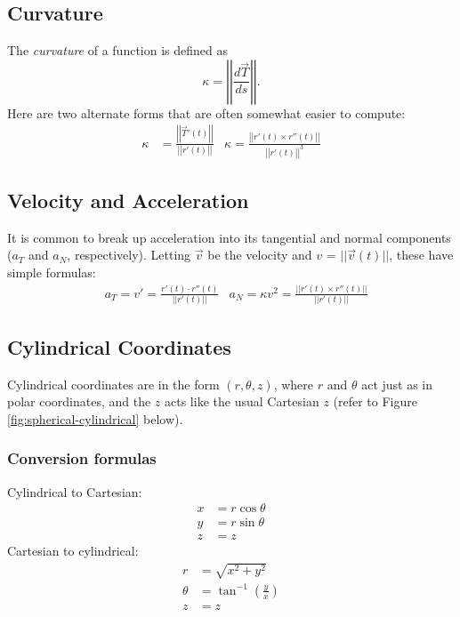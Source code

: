 \documentclass[12pt]{article}
\theoremstyle{definition}
\begin{document}
\subsection{Curvature}
The \textit{curvature} of a function is defined as \begin{equation*}
	\kappa = \left| \left| \frac{d\vec{T}}{ds} \right| \right|.
\end{equation*}
Here are two alternate forms that are often somewhat easier to compute: \begin{align*}
	\kappa & = \frac{\left| \left| \vec{T}'(t) \right| \right|}{\left| \left| r'(t) \right| \right|} & \kappa = \frac{\left| \left| r'(t)\times r''(t) \right| \right|}{\left| \left| r'(t) \right| \right|^3}
\end{align*}

\subsection{Velocity and Acceleration}
It is common to break up acceleration into its tangential and normal components ($a_T$ and $a_N$, respectively).
Letting $\vec{v}$ be the velocity and $v$ = $||\vec{v}(t)||$, these have simple formulas: \begin{align*}
	 & a_T = v' = \frac{r'(t) \cdot r''(t)}{||r'(t)||} & a_N = \kappa v^2 = \frac{||r'(t) \times r''(t)||}{||r'(t)||}
\end{align*}

\subsection{Cylindrical Coordinates}
Cylindrical coordinates are in the form $(r, \theta, z)$, where $r$ and $\theta$ act just as in polar coordinates, and the $z$ acts like the usual Cartesian $z$ (refer to Figure \ref{fig:spherical-cylindrical} below).
\subsubsection{Conversion formulas}
Cylindrical to Cartesian: \begin{align*}
	x & = r\cos\theta \\
	y & = r\sin\theta \\
	z & = z
\end{align*}
Cartesian to cylindrical: \begin{align*}
	r      & = \sqrt{x^2+y^2}                    \\
	\theta & = \tan^{-1}\left(\frac{y}{x}\right) \\
	z      & = z
\end{align*}
\end{document}
